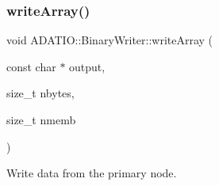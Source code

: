 \subsubsection{\texorpdfstring{writeArray()}{writeArray()}\hspace{0.1cm}{\footnotesize\ttfamily [2/3]}}
{\footnotesize\ttfamily void A\+D\+A\+T\+I\+O\+::\+Binary\+Writer\+::write\+Array (\begin{DoxyParamCaption}\item[{const char $\ast$}]{output,  }\item[{size\+\_\+t}]{nbytes,  }\item[{size\+\_\+t}]{nmemb }\end{DoxyParamCaption})\hspace{0.3cm}{\ttfamily [virtual]}}



Write data from the primary node. 


